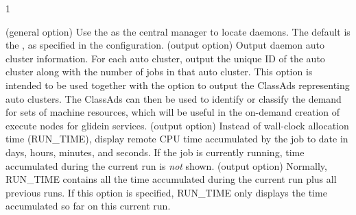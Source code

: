 \begin{ManPage}{\label{man-condor-q}}{1}
\begin{Options}
  \ToolDebugDesc
    {(general option) Use the  as 
    the central manager to locate  daemons.
    The default is the ,
    as specified in the configuration.}
   {(output option) 
    Output  daemon auto cluster information.
    For each auto cluster,
    output the unique ID of the auto cluster
    along with the number of jobs in that auto cluster. 
    This option is intended to be used together with the  option
    to output the ClassAds representing auto clusters.  
    The ClassAds can then be used to identify or classify the demand for
    sets of machine resources, 
    which will be useful in the on-demand creation of execute nodes for
    glidein services. } 
   {(output option) 
    Instead of wall-clock allocation time (RUN\_TIME), 
    display remote CPU time accumulated by the job to date in days,
    hours, minutes, and seconds.  If the job is currently running, time
    accumulated during the current run is \emph{not} shown.}
   {(output option)
    Normally, RUN\_TIME contains all the time
    accumulated during the current run plus all previous runs.  If this
    option is specified, RUN\_TIME only displays the time accumulated so
    far on this current run.}

\end{Options}
\end{ManPage}
